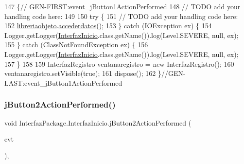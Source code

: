 \begin{DoxyCode}
147                                                                          \{\textcolor{comment}{//
      GEN-FIRST:event\_jButton1ActionPerformed}
148         \textcolor{comment}{// TODO add your handling code here:}
149         
150         \textcolor{keywordflow}{try} \{
151             \textcolor{comment}{// TODO add your handling code here:}
152             \mbox{\hyperlink{class_interfaz_package_1_1_interfaz_inicio_adccd9cfdf4551ca7ae66b2c9caffa049}{libreriaobjeto}}.\mbox{\hyperlink{classlibreria_1_1_libreria_a0ebf81d2e66a26a82de5b997aae37065}{accederdatos}}();
153         \} \textcolor{keywordflow}{catch} (IOException ex) \{
154             Logger.getLogger(\mbox{\hyperlink{class_interfaz_package_1_1_interfaz_inicio_ab0f2775716e858910156769284c39718}{InterfazInicio}}.class.getName()).log(Level.SEVERE, null, ex);
155         \} \textcolor{keywordflow}{catch} (ClassNotFoundException ex) \{
156             Logger.getLogger(\mbox{\hyperlink{class_interfaz_package_1_1_interfaz_inicio_ab0f2775716e858910156769284c39718}{InterfazInicio}}.class.getName()).log(Level.SEVERE, null, ex);
157         \}
158         
159         InterfazRegistro ventanaregistro = \textcolor{keyword}{new} InterfazRegistro();
160         ventanaregistro.setVisible(\textcolor{keyword}{true});
161         dispose();
162     \}\textcolor{comment}{//GEN-LAST:event\_jButton1ActionPerformed}
\end{DoxyCode}
\mbox{\label{class_interfaz_package_1_1_interfaz_inicio_ad2ad6b62da3001452aabde985ec7b648}} 
\subsubsection{\texorpdfstring{j\+Button2\+Action\+Performed()}{jButton2ActionPerformed()}}
{\footnotesize\ttfamily void Interfaz\+Package.\+Interfaz\+Inicio.\+j\+Button2\+Action\+Performed (\begin{DoxyParamCaption}\item[{java.\+awt.\+event.\+Action\+Event}]{evt }\end{DoxyParamCaption})\hspace{0.3cm}{\ttfamily [inline]}, {\ttfamily [private]}}


